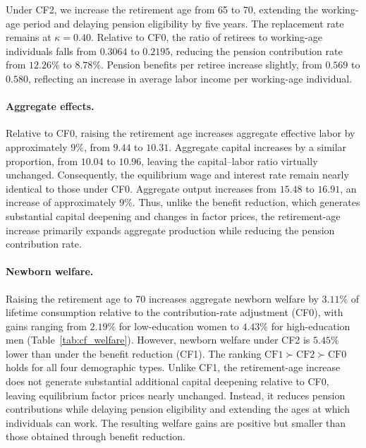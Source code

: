 \documentclass[12pt,a4paper]{article}
\begin{document}
Under CF2, we increase the retirement age from 65 to 70, extending the working-age period and delaying pension eligibility by five years. The replacement rate remains at $\kappa=0.40$. Relative to CF0, the ratio of retirees to working-age individuals falls from $0.3064$ to $0.2195$, reducing the pension contribution rate from $12.26\%$ to $8.78\%$. Pension benefits per retiree increase slightly, from $0.569$ to $0.580$, reflecting an increase in average labor income per working-age individual.


\paragraph{Aggregate effects.}
Relative to CF0, raising the retirement age increases aggregate effective labor by approximately $9\%$, from $9.44$ to $10.31$. Aggregate capital increases by a similar proportion, from $10.04$ to $10.96$, leaving the capital--labor ratio virtually unchanged. Consequently, the equilibrium wage and interest rate remain nearly identical to those under CF0. Aggregate output increases from $15.48$ to $16.91$, an increase of approximately $9\%$. Thus, unlike the benefit reduction, which generates substantial capital deepening and changes in factor prices, the retirement-age increase primarily expands aggregate production while reducing the pension contribution rate.

\paragraph{Newborn welfare.}
Raising the retirement age to 70 increases aggregate newborn welfare by $3.11\%$ of lifetime consumption relative to the contribution-rate adjustment (CF0), with gains ranging from $2.19\%$ for low-education women to $4.43\%$ for high-education men (Table~\ref{tab:cf_welfare}). However, newborn welfare under CF2 is $5.45\%$ lower than under the benefit reduction (CF1). The ranking $\mathrm{CF1}\succ\mathrm{CF2}\succ\mathrm{CF0}$ holds for all four demographic types. Unlike CF1, the retirement-age increase does not generate substantial additional capital deepening relative to CF0, leaving equilibrium factor prices nearly unchanged. Instead, it reduces pension contributions while delaying pension eligibility and extending the ages at which individuals can work. The resulting welfare gains are positive but smaller than those obtained through benefit reduction.
\end{document}

